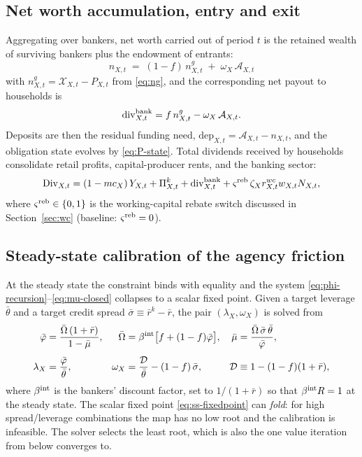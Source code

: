 \documentclass[11pt]{article}
\numberwithin{equation}{section}
\theoremstyle{definition}
\theoremstyle{plain}
\theoremstyle{remark}
\begin{document}
\subsection{Net worth accumulation, entry and exit}

Aggregating over bankers, net worth carried out of period $t$ is the retained wealth
of surviving bankers plus the endowment of entrants:
\begin{equation}
\boxed{\;n_{X,t}\;=\;(1-f)\,n^{g}_{X,t}\;+\;\omega_X\,\mathcal{A}_{X,t}\;}
\label{eq:nw-lom}
\end{equation}
with $n^{g}_{X,t}=\mathcal{X}_{X,t}-P_{X,t}$ from \eqref{eq:ng}, and the corresponding
net payout to households is
\begin{equation}
\mathrm{div}^{\rm bank}_{X,t}=f\,n^{g}_{X,t}-\omega_X\,\mathcal{A}_{X,t}.
\label{eq:bank-div}
\end{equation}
Deposits are then the residual funding need, $\mathrm{dep}_{X,t}=\mathcal{A}_{X,t}-n_{X,t}$,
and the obligation state evolves by \eqref{eq:P-state}. Total dividends received by
households consolidate retail profits, capital-producer rents, and the banking sector:
\begin{equation}
\mathrm{Div}_{X,t}=(1-mc_X)\,Y_{X,t}+\Pi^{k}_{X,t}+\mathrm{div}^{\rm bank}_{X,t}
+\varsigma^{\rm reb}\,\zeta_X r^{wc}_{X,t}w_{X,t}N_{X,t},
\label{eq:dividends}
\end{equation}
where $\varsigma^{\rm reb}\in\{0,1\}$ is the working-capital rebate switch discussed
in Section~\ref{sec:wc} (baseline: $\varsigma^{\rm reb}=0$).

\subsection{Steady-state calibration of the agency friction}
\label{sec:bankcal}

At the steady state the constraint binds with equality and the system
\eqref{eq:phi-recursion}--\eqref{eq:mu-closed} collapses to a scalar fixed point.
Given a target leverage $\bar\theta$ and a target credit spread
$\bar\sigma\equiv \bar r^{k}-\bar r$, the pair $(\lambda_X,\omega_X)$ is solved from
\begin{align}
\bar\varphi&=\frac{\bar\Omega\,(1+\bar r)}{1-\bar\mu},
&
\bar\Omega&=\beta^{\rm int}\bigl[f+(1-f)\bar\varphi\bigr],
&
\bar\mu&=\frac{\bar\Omega\,\bar\sigma\,\bar\theta}{\bar\varphi},
\label{eq:ss-fixedpoint}\\[4pt]
\lambda_X&=\frac{\bar\varphi}{\bar\theta},
&
\omega_X&=\frac{\mathcal{D}}{\bar\theta}-(1-f)\,\bar\sigma,
&
\mathcal{D}&\equiv1-(1-f)(1+\bar r),
\label{eq:ss-lambda-omega}
\end{align}
where $\beta^{\rm int}$ is the bankers' discount factor, set to $1/(1+\bar r)$ so that
$\beta^{\rm int}R=1$ at the steady state. The scalar fixed point
\eqref{eq:ss-fixedpoint} can \emph{fold}: for high spread/leverage combinations the
map has no low root and the calibration is infeasible. The solver selects the least
root, which is also the one value iteration from below converges to.
\end{document}
